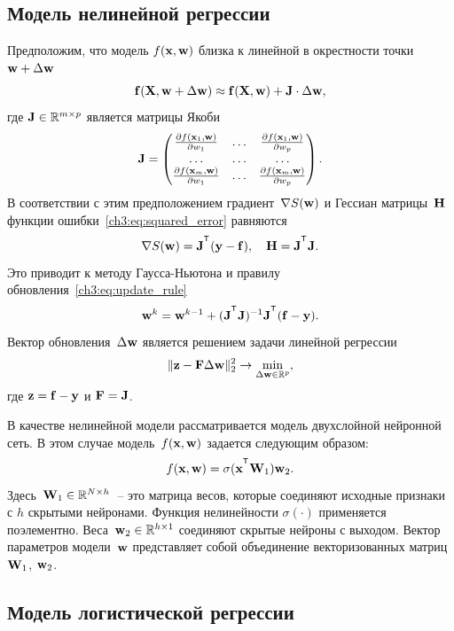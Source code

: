 \subsection{Модель нелинейной регрессии}
Предположим, что модель $f (\mathbf{x} , \mathbf{w})$ близка к линейной в окрестности точки $\mathbf{w} + \Delta \mathbf{w}$
\[
\mathbf{f}(\mathbf{X} , \mathbf{w} + \Delta \mathbf{w}) \approx \mathbf{f}(\mathbf{X} , \mathbf{w}) + \mathbf{J} \cdot \Delta  \mathbf{w},
\]
где $\mathbf{J} \in \mathbb{R}^{m \times p}$ является матрицы Якоби
\begin{equation}
\mathbf{J} = 
\begin{pmatrix}
\frac{\partial f(\mathbf{x}_1 , \mathbf{w})}{\partial w_1} & \dots & 
\frac{\partial f(\mathbf{x}_1 , \mathbf{w})}{\partial w_p} \\
\dots & \dots & \dots \\
\frac{\partial f(\mathbf{x}_m , \mathbf{w})}{\partial w_1} & \dots & 
\frac{\partial f(\mathbf{x}_m , \mathbf{w})}{\partial w_p}
\end{pmatrix}.
\end{equation}
В соответствии с этим предположением градиент~$\nabla S(\mathbf{w})$ и Гессиан матрицы~$\mathbf{H}$ функции ошибки~\eqref{ch3:eq:squared_error} равняются
\begin{equation}
\nabla S(\bw) = \bJ^{\T} (\by - \mathbf{f}), \quad \bH = \bJ^{\T} \bJ.
\label{ch3:eq:nonlin_reg_deriv}
\end{equation}
Это приводит к методу Гаусса-Ньютона и правилу обновления~\eqref{ch3:eq:update_rule}
\[
\bw^k = \bw^{k - 1} + (\bJ^{\T} \bJ)^{-1}\bJ^{\T}(\mathbf{f} - \by).
\]
Вектор обновления~$\Delta \mathbf{w}$ является решением задачи линейной регрессии
\begin{equation}
\| \mathbf{z} - \mathbf{F} \Delta \mathbf{w} \|_2^2 \rightarrow \min_{\Delta \mathbf{w} \in \mathbb{R}^{p}},
\label{ch3:eq:lin_reg_nonlin_reg}
\end{equation}
где $\mathbf{z} = \mathbf{f} - \mathbf{y}$ и $\mathbf{F} = \mathbf{J}$.

В качестве нелинейной модели рассматривается модель двухслойной нейронной сеть. В этом случае модель~$f (\mathbf{x}, \mathbf{w})$ задается
следующим образом:
\[
f(\bx, \bw) = \sigma(\bx^{\T} \bW_1) \bw_2.
\]
Здесь~$\mathbf{W}_1 \in \mathbb{R}^{N \times h}$~-- это матрица весов, которые соединяют исходные признаки с $h$ скрытыми нейронами. Функция нелинейности $\sigma(\cdot)$ применяется поэлементно. Веса~$\mathbf{w}_2 \in \mathbb{R}^{h \times 1}$ соединяют скрытые нейроны с выходом. 
Вектор параметров модели~$\mathbf{w}$ представляет собой объединение векторизованных матриц~$\mathbf{W}_1$, $\mathbf{w}_2$.

\subsection{Модель логистической регрессии}

